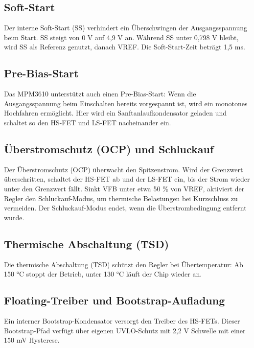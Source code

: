 \subsection{Soft-Start}

Der interne Soft-Start (SS) verhindert ein Überschwingen der Ausgangsspannung beim Start. SS steigt von 0 V auf 4,9 V an. Während SS unter 0,798 V bleibt, wird SS als Referenz genutzt, danach VREF. Die Soft-Start-Zeit beträgt 1,5 ms. \cite{MPS:2015}

\subsection{Pre-Bias-Start}

Das MPM3610 unterstützt auch einen Pre-Bias-Start: Wenn die Ausgangsspannung beim Einschalten bereits vorgespannt ist, wird ein monotones Hochfahren ermöglicht. Hier wird ein Sanftanlaufkondensator geladen und schaltet so den HS-FET und LS-FET nacheinander ein. \cite{MPS:2015}

\subsection{Überstromschutz (OCP) und Schluckauf}

Der Überstromschutz (OCP) überwacht den Spitzenstrom. Wird der Grenzwert überschritten, schaltet der HS-FET ab und der LS-FET ein, bis der Strom wieder unter den Grenzwert fällt. Sinkt VFB unter etwa 50 \% von VREF, aktiviert der Regler den Schluckauf-Modus, um thermische Belastungen bei Kurzschluss zu vermeiden. Der Schluckauf-Modus endet, wenn die Überstrombedingung entfernt wurde. \cite{MPS:2015}

\subsection{Thermische Abschaltung (TSD)}

Die thermische Abschaltung (TSD) schützt den Regler bei Übertemperatur: Ab \parfillskip=0pt 150 °C stoppt der Betrieb, unter 130 °C läuft der Chip wieder an. \cite{MPS:2015}

\subsection{Floating-Treiber und Bootstrap-Aufladung}

Ein interner Bootstrap-Kondensator versorgt den Treiber des HS-FETs. Dieser Bootstrap-Pfad verfügt über eigenen UVLO-Schutz mit 2,2 V Schwelle mit einer 150 mV Hysterese. \cite{MPS:2015}

